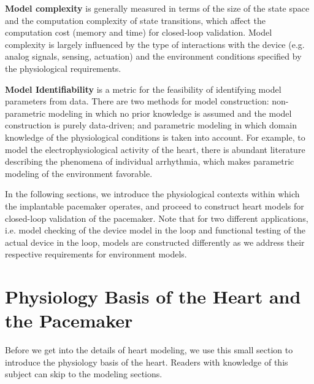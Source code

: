 \textbf{Model complexity} is generally measured in terms of the size of the state space and the computation complexity of state transitions, which affect the computation cost (memory and time) for closed-loop validation. Model complexity is largely influenced by the type of interactions with the device (e.g. analog signals, sensing, actuation) and the environment conditions specified by the physiological requirements. 

\textbf{Model Identifiability} is a metric for the feasibility of identifying model parameters from data. There are two methods for model construction: non-parametric modeling in which no prior knowledge is assumed and the model construction is purely data-driven; and parametric modeling in which domain knowledge of the physiological conditions is taken into account. For example, to model the electrophysiological activity of the heart, there is abundant literature describing the phenomena of individual arrhythmia, which makes parametric modeling of the environment favorable.



In the following sections, we introduce the physiological contexts within which the implantable pacemaker operates, and proceed to construct heart models for closed-loop validation of the pacemaker. Note that for two different applications, i.e. model checking of the device model in the loop and functional testing of the actual device in the loop, models are constructed differently as we address their respective requirements for environment models. 

\section{Physiology Basis of the Heart and the Pacemaker}
Before we get into the details of heart modeling, we use this small section to introduce the physiology basis of the heart. Readers with knowledge of this subject can skip to the modeling sections.

